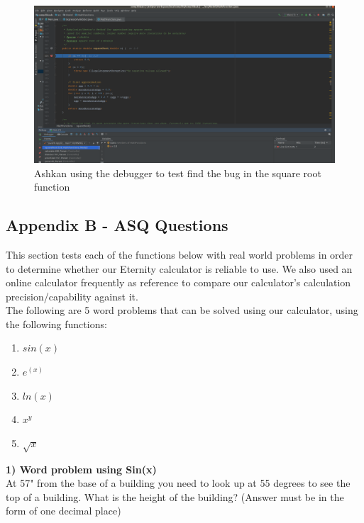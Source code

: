 \documentclass[a4paper, 12pt]{article}
\begin{document}
\vspace{20mm}
\begin{figure}[H]
\centering
\includegraphics[width=1.13\textwidth]{Ashkan1.png}
\caption{Ashkan using the debugger to test find the bug in the square root function}
\label{Ashkan}
\end{figure}

\pagebreak

\subsection{Appendix B - ASQ Questions}

This section tests each of the functions below with real world problems in order to determine whether our Eternity calculator is reliable to use. We also used an online calculator frequently as reference to compare our calculator’s calculation precision/capability against it.
\\

The following are 5 word problems that can be solved using our calculator, using the following functions: 
\\

\begin{enumerate}
	\item $sin(x)$
	\item $e^(x)$
	\item $ln(x)$ 
	\item $x^y$ 
	\item $\sqrt{x}$
\end{enumerate}


\textbf{1) Word problem using Sin(x)}
\\

At 57" from the base of a building you need to look up at 55 degrees to see the top of a building. What is the height of the building? (Answer must be in the form of one decimal place)
\\
\end{document}
